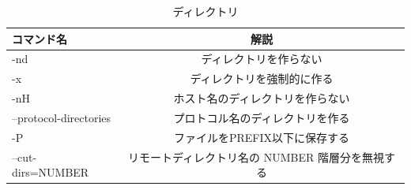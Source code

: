 \newpage

\begin{table}[H]
  \begin{center}
    \caption{ディレクトリ}
    \begin{tabular}{|l|c|} \hline
      コマンド名 & 解説  \\ \hline
-nd & ディレクトリを作らない \\
-x & ディレクトリを強制的に作る \\
-nH & ホスト名のディレクトリを作らない \\
--protocol-directories & プロトコル名のディレクトリを作る \\
-P & ファイルをPREFIX以下に保存する \\
--cut-dirs=NUMBER & リモートディレクトリ名の NUMBER 階層分を無視する \\ \hline
    \end{tabular}
  \end{center}
\end{table}


